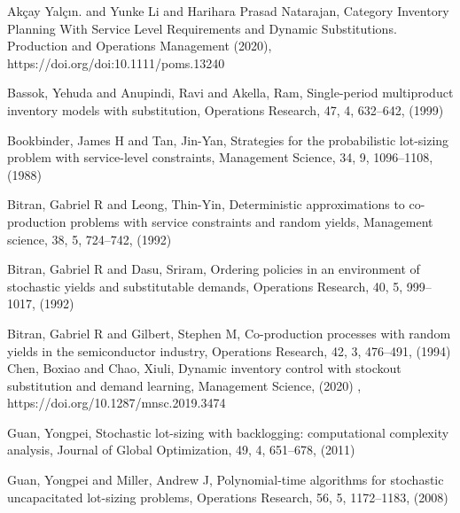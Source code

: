 \documentclass[10pt]{article}
\begin{document}
\begin{thebibliography}{99}







Akçay Yalçın. and Yunke Li and Harihara Prasad Natarajan, Category Inventory Planning With
Service Level Requirements and Dynamic Substitutions.
Production and Operations Management (2020), https://doi.org/doi:10.1111/poms.13240

Bassok, Yehuda and Anupindi, Ravi and Akella, Ram,
Single-period multiproduct inventory models with substitution, Operations Research, 47, 4, 632--642, (1999)
 

 Bookbinder, James H and Tan, Jin-Yan, Strategies for the probabilistic lot-sizing problem with service-level constraints, Management Science, 34, 9, 1096--1108,
 (1988)


Bitran, Gabriel R and Leong, Thin-Yin, Deterministic approximations to co-production problems with service constraints and random yields, Management science, 38, 5, 724--742, (1992)
  
  
Bitran, Gabriel R and Dasu, Sriram, Ordering policies in an environment of stochastic yields and substitutable demands,
Operations Research,
40, 5,
999--1017, (1992)

Bitran, Gabriel R and Gilbert, Stephen M,
  Co-production processes with random yields in the semiconductor industry, Operations Research, 42, 3, 476--491, (1994)
Chen, Boxiao and Chao, Xiuli, Dynamic inventory control with stockout substitution and demand learning, Management Science, (2020) , https://doi.org/10.1287/mnsc.2019.3474


 Guan, Yongpei, Stochastic lot-sizing with backlogging: computational complexity analysis,  Journal of Global Optimization, 49, 4, 651--678, (2011)

  Guan, Yongpei and Miller, Andrew J, Polynomial-time algorithms for stochastic uncapacitated lot-sizing problems,  Operations Research, 56, 5, 1172--1183,
(2008)



\end{thebibliography}
\end{document}
